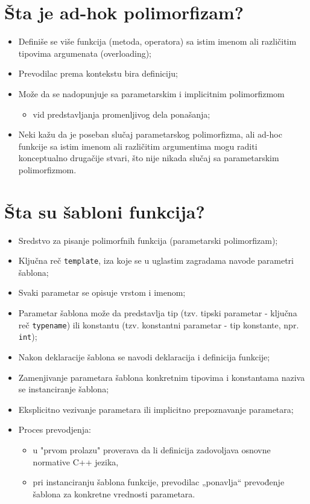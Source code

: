 \documentclass[a4paper]{article}
\begin{document}
\section{Šta je ad-hok polimorfizam?}
  \begin{itemize}
    \item Definiše se više funkcija (metoda, operatora) sa istim imenom ali različitim tipovima argumenata (overloading);
    \item Prevodilac prema kontekstu bira definiciju;
    \item Može da se nadopunjuje sa parametarskim i implicitnim polimorfizmom
	\begin{itemize} 
		\item vid predstavljanja promenljivog dela ponašanja;
	\end{itemize}
    \item Neki kažu da je poseban slučaj parametarskog polimorfizma, ali ad-hoc funkcije sa istim imenom ali različitim argumentima mogu raditi konceptualno drugačije stvari, što nije nikada slučaj sa parametarskim polimorfizmom.
  \end{itemize}

\section{Šta su šabloni funkcija?}
  \begin{itemize}
    \item Sredstvo za pisanje polimorfnih funkcija (parametarski polimorfizam);
    \item Ključna reč \texttt{template}, iza koje se u uglastim zagradama navode parametri šablona;
    \item Svaki parametar se opisuje vrstom i imenom;
    \item Parametar šablona može da predstavlja tip (tzv. tipski parametar - ključna reč \texttt{typename}) ili konstantu (tzv. konstantni parametar - tip konstante, npr. \texttt{int});
    \item Nakon deklaracije šablona se navodi deklaracija i definicija funkcije;
    \item Zamenjivanje parametara šablona konkretnim tipovima i konstantama naziva se instanciranje šablona;
    \item Eksplicitno vezivanje parametara ili implicitno prepoznavanje parametara;
    \item Proces prevodjenja: 
	\begin{itemize}
	\item u "prvom prolazu" proverava da li definicija zadovoljava osnovne normative C++ jezika, 
	\item pri instanciranju šablona funkcije, prevodilac „ponavlja“ prevođenje šablona za konkretne vrednosti parametara.
	\end{itemize}
  \end{itemize}
\end{document}
